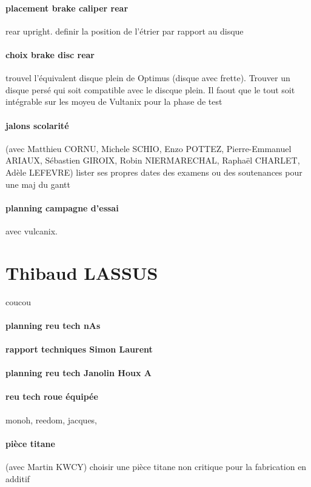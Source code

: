 \paragraph{placement brake caliper rear} rear upright. definir la position de l'étrier par rapport au disque
\paragraph{choix brake disc rear} trouvel l'équivalent disque plein de Optimus (disque avec frette). Trouver un disque persé qui soit compatible avec le discque plein. Il faout que le tout soit intégrable sur les moyeu de Vultanix pour la phase de test
\paragraph{jalons scolarité} (avec Matthieu CORNU, Michele SCHIO, Enzo POTTEZ, Pierre-Emmanuel ARIAUX, Sébastien GIROIX, Robin NIERMARECHAL, Raphaël CHARLET, Adèle LEFEVRE) lister ses propres dates des examens ou des soutenances pour une maj du gantt
\paragraph{planning campagne d'essai} avec vulcanix.

 
 \newpage \section*{Thibaud LASSUS} 
 \par coucou
\paragraph{planning reu tech nAs} 
\paragraph{rapport techniques Simon Laurent} 
\paragraph{planning reu tech Janolin Houx A} 
\paragraph{reu tech roue équipée} monoh, reedom, jacques, 
\paragraph{pièce titane} (avec Martin KWCY) choisir une pièce titane non critique pour la fabrication en additif

